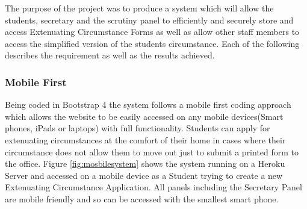 \documentclass[../main.tex]{subfiles}
\begin{document}
\raggedright
The purpose of the project was to produce a system which will allow the students, secretary and the scrutiny panel to efficiently and securely store and access Extenuating Circumstance Forms as well as allow other staff members to access the simplified version of the students circumstance. Each of the following describes the requirement as well as the results achieved. 

\subsubsection{Mobile First}
Being coded in Bootstrap 4\cite{bootstrapfour} the system follows a mobile first coding approach which allows the website to be easily accessed on any mobile devices(Smart phones, iPads or laptops) with full functionality. Students can apply for extenuating circumstances at the comfort of their home in cases where their circumstance does not allow them to move out just to submit a printed form to the office. Figure \ref{fig:mosbilesystem} shows the system running on a Heroku Server and accessed on a mobile device as a Student trying to create a new Extenuating Circumstance Application. All panels including the Secretary Panel are mobile friendly and so can be accessed with the smallest smart phone. 
\end{document}
